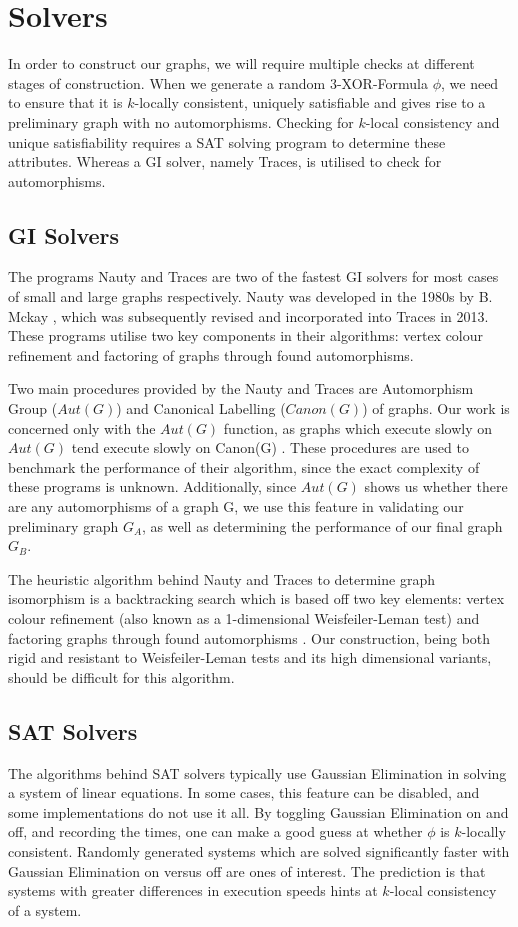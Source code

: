 \section[Solvers]{Solvers}
In order to construct our graphs, we will require multiple checks at different stages of construction. When we generate a random 3-XOR-Formula $\phi$, we need to ensure that it is $k$-locally consistent, uniquely satisfiable and gives rise to a preliminary graph with no automorphisms.  Checking for $k$-local consistency and unique satisfiability requires a SAT solving program to determine these attributes. Whereas a GI solver, namely Traces, is utilised to check for automorphisms.

\subsection[GI Solvers]{GI Solvers}
The programs Nauty and Traces are two of the fastest GI solvers for most cases of small and large graphs respectively. Nauty  was developed in the 1980s by B. Mckay \cite{mckay1981practical}, which was subsequently revised and incorporated into Traces \cite{mckay2014practical} in 2013. These programs utilise two key components in their algorithms: vertex colour refinement and factoring of graphs through found automorphisms.
\par
Two main procedures provided by the Nauty and Traces are Automorphism Group ($Aut(G)$) and Canonical Labelling ($Canon(G)$) of graphs. Our work is concerned only with the $Aut(G)$ function, as graphs which execute slowly on $Aut(G)$ tend execute slowly on Canon(G) \cite{mckay2014practical}. These procedures are used to benchmark the performance of their algorithm, since the exact complexity of these programs is unknown. Additionally, since $Aut(G)$ shows us whether there are any automorphisms of a graph G, we use this feature in validating our preliminary graph $G_A$, as well as determining the performance of our final graph $G_B$.
\par
The heuristic algorithm behind Nauty and Traces to determine graph isomorphism is a backtracking search which is based off two key elements: vertex colour refinement (also known as a 1-dimensional Weisfeiler-Leman test) and factoring graphs through found automorphisms \cite{mckay2014practical}. Our construction, being both rigid and resistant to Weisfeiler-Leman tests and its high dimensional variants, should be difficult for this algorithm.
\newpage
\subsection{SAT Solvers}
The algorithms behind SAT solvers typically use Gaussian Elimination in solving a system of linear equations. In some cases, this feature can be disabled, and some implementations do not use it all. By toggling Gaussian Elimination on and off, and recording the times, one can make a good guess at whether $\phi$ is $k$-locally consistent. Randomly generated systems which are solved significantly faster with Gaussian Elimination on versus off are ones of interest. The prediction is that systems with greater differences in execution speeds hints at $k$-local consistency of a system.

